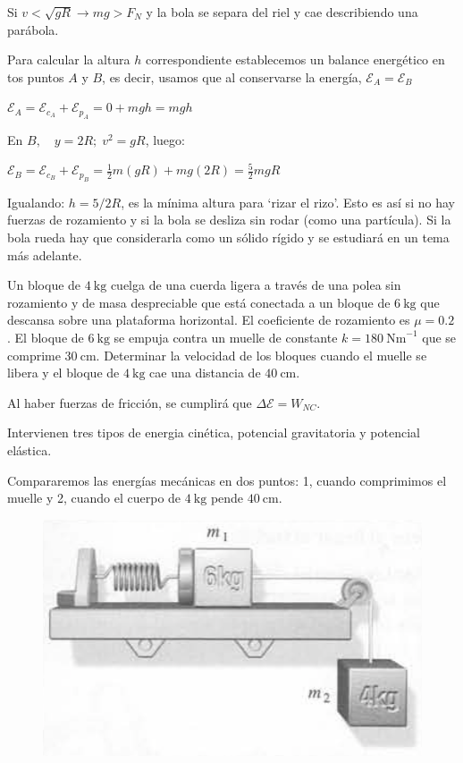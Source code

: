 Si $v < \sqrt{gR} \to mg>F_N $ y la bola se separa del riel y cae describiendo una parábola.

Para calcular la altura $h$ correspondiente establecemos un balance energético en tos puntos $A$ y $B$, es decir, usamos que al conservarse la energía, $\mathcal E_A=\mathcal E_B$

$\mathcal E_A=\mathcal E_{c_A}+\mathcal E_{p_A}=0+mgh=mgh$

En $B,\quad y=2R; \; v^2=gR$, luego:

$\mathcal E_B=\mathcal E_{c_B}+\mathcal E_{p_B}=\frac 1 2 m (gR) + mg(2R)=\frac 5 2 mgR$

Igualando: $h= 5 / 2 R$, es la mínima altura para `rizar el rizo'. Esto es así si no hay fuerzas de rozamiento y si la bola se desliza sin rodar (como una partícula). Si la bola rueda hay que considerarla como un sólido rígido y se estudiará en un tema más adelante.



\begin{prob}
	Un bloque de $4 \ \mathrm{kg}$ cuelga de una cuerda ligera a través de una polea sin rozamiento y de masa despreciable que está conectada a un bloque de $ 6 \ \mathrm{kg}$ que descansa sobre una plataforma horizontal. El coeficiente de rozamiento es $\mu=0.2$. El bloque de $6 \ \mathrm{kg}$ se empuja contra un muelle de constante $k=180\ \mathrm{Nm}^{-1}$ que se comprime $30 \ \mathrm{cm}$. Determinar la velocidad de los bloques cuando el muelle se libera y el bloque de $4 \ \mathrm{kg}$ cae una distancia de $40 \ \mathrm{cm}$.
\end{prob}

Al haber fuerzas de fricción, se cumplirá que $\Delta \mathcal E=W_{NC}$.
\begin{multicols}{2}

Intervienen tres tipos de energia cinética, potencial gravitatoria y potencial elástica.

Compararemos las energías mecánicas en dos puntos: 1, cuando comprimimos el muelle y 2, cuando el cuerpo de $4 \ \mathrm{kg}$ pende $40\ \mathrm{cm}$.
\begin{figure}[H]
	\centering
	\includegraphics[width=.55\textwidth]{imagenes/imagenes04/T04IM25.png}
\end{figure}
\end{multicols}

